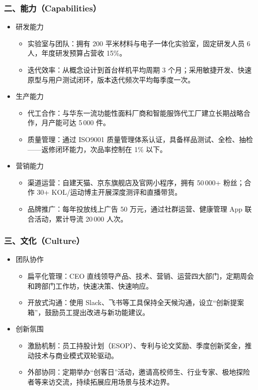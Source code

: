 \documentclass[UTF8]{report}
\theoremstyle{MyLineTheoremStyle} %
\theoremstyle{MyBlockTheoremStyle} %
\theoremstyle{MySubsubsectionStyle} %
\begin{document}
  \subsubsection{二、能力（Capabilities）}
    \begin{itemize}
      \item 研发能力
        \begin{itemize}
          \item 实验室与团队：拥有 200 平米材料与电子一体化实验室，固定研发人员 6 人，年度研发预算占营收 15\%。  
          \item 迭代效率：从概念设计到首台样机平均周期 3 个月；采用敏捷开发、快速原型与用户测试闭环，版本迭代频次平均每季度一次。
        \end{itemize}
      \item 生产能力
        \begin{itemize}
          \item 代工合作：与华东一流功能性面料厂商和智能服饰代工厂建立长期战略合作，月产能可达 5\,000 件。  
          \item 质量管理：通过 ISO9001 质量管理体系认证，具备样品测试、全检、抽检——返修闭环能力，次品率控制在 1\% 以下。
        \end{itemize}
      \item 营销能力
        \begin{itemize}
          \item 渠道运营：自建天猫、京东旗舰店及官网小程序，拥有 50\,000+ 粉丝；合作 30+ KOL/运动博主开展深度测评和直播带货。  
          \item 品牌推广：每年投放线上广告 50 万元，通过社群运营、健康管理 App 联合活动，累计导流 20\,000 人次。
        \end{itemize}
    \end{itemize}

  \subsubsection{三、文化（Culture）}
    \begin{itemize}
      \item 团队协作
        \begin{itemize}
          \item 扁平化管理：CEO 直线领导产品、技术、营销、运营四大部门，定期周会和跨部门工作坊，快速决策、快速响应。  
          \item 开放式沟通：使用 Slack、飞书等工具保持全天候沟通，设立“创新提案箱”，鼓励员工提出改进与新功能建议。
        \end{itemize}
      \item 创新氛围
        \begin{itemize}
          \item 激励机制：员工持股计划（ESOP）、专利与论文奖励、季度创新奖金，推动技术与商业模式双轮驱动。  
          \item 外部协同：定期举办“创客日”活动，邀请高校师生、行业专家、极地探险者等来访交流，持续拓展应用场景与技术边界。
        \end{itemize}
    \end{itemize}
\end{document}
